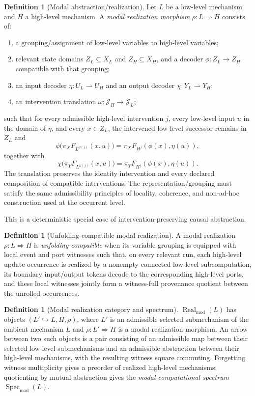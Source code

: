 \documentclass[11pt,a4paper]{article}
\theoremstyle{clean}
\theoremstyle{definition}
\newtheorem{definition}[theorem]{Definition}
\newcommand{\Spec}{\operatorname{Spec}}
\newcommand{\Real}{\operatorname{Real}}
\newcommand{\Mod}{\mathrm{mod}}
\begin{document}
\begin{definition}[Modal abstraction/realization]
Let $L$ be a low-level mechanism and $H$ a high-level mechanism. A \emph{modal realization morphism} $\rho:L\Rightarrow H$ consists of:
\begin{enumerate}
  \item a grouping/assignment of low-level variables to high-level variables;
  \item relevant state domains $Z_L\subseteq X_L$ and $Z_H\subseteq X_H$, and a decoder $\phi:Z_L\to Z_H$ compatible with that grouping;
  \item an input decoder $\eta:U_L\rightharpoonup U_H$ and an output decoder $\chi:Y_L\rightharpoonup Y_H$;
  \item an intervention translation $\omega:\mathcal J_H\to\mathcal J_L$;
\end{enumerate}
such that for every admissible high-level intervention $j$, every low-level input $u$ in the domain of $\eta$, and every $x\in Z_L$, the intervened low-level successor remains in $Z_L$ and
\[
\phi\bigl(\pi_X F_{L^{\omega(j)}}(x,u)\bigr)
=\pi_XF_{H^j}(\phi(x),\eta(u)),
\]
together with
\[
\chi\bigl(\pi_Y F_{L^{\omega(j)}}(x,u)\bigr)
=\pi_YF_{H^j}(\phi(x),\eta(u)).
\]
The translation preserves the identity intervention and every declared composition of compatible interventions. The representation/grouping must satisfy the same admissibility principles of locality, coherence, and non-ad-hoc construction used at the occurrent level.
\end{definition}

This is a deterministic special case of intervention-preserving causal abstraction.

\begin{definition}[Unfolding-compatible modal realization]
A modal realization $\rho:L\Rightarrow H$ is \emph{unfolding-compatible} when its variable grouping is equipped with local event and port witnesses such that, on every relevant run, each high-level update occurrence is realized by a nonempty connected low-level subcomputation, its boundary input/output tokens decode to the corresponding high-level ports, and these local witnesses jointly form a witness-full provenance quotient between the unrolled occurrences.
\end{definition}

\begin{definition}[Modal realization category and spectrum]
$\Real_\Mod(L)$ has objects $(L'\hookrightarrow L,H,\rho)$, where $L'$ is an admissible selected submechanism of the ambient mechanism $L$ and $\rho:L'\Rightarrow H$ is a modal realization morphism. An arrow between two such objects is a pair consisting of an admissible map between their selected low-level submechanisms and an admissible abstraction between their high-level mechanisms, with the resulting witness square commuting. Forgetting witness multiplicity gives a preorder of realized high-level mechanisms; quotienting by mutual abstraction gives the \emph{modal computational spectrum} $\Spec_\Mod(L)$.
\end{definition}
\end{document}
